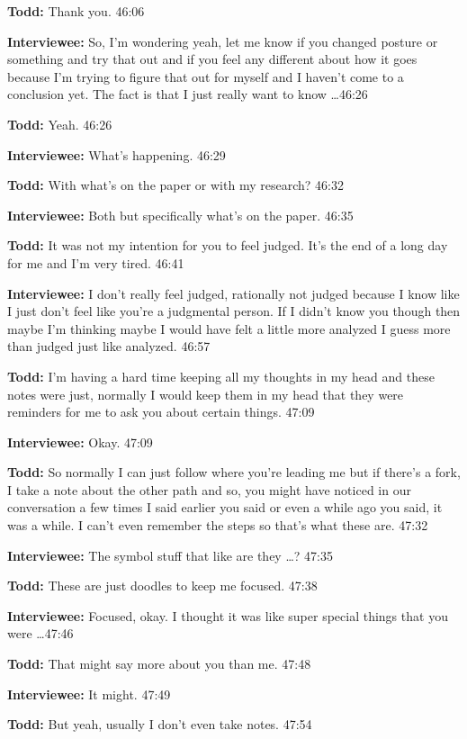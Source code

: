 \textbf{Todd:} Thank you.  46:06

\textbf{Interviewee:} So, I'm wondering yeah, let me know if you changed posture or something and try that out and if you feel any different about how it goes because I'm trying to figure that out for myself and I haven't come to a conclusion yet.  The fact is that I just really want to know \ldots  46:26

\textbf{Todd:} Yeah.  46:26

\textbf{Interviewee:} What's happening.  46:29

\textbf{Todd:} With what's on the paper or with my research?  46:32

\textbf{Interviewee:} Both but specifically what's on the paper.  46:35

\textbf{Todd:} It was not my intention for you to feel judged.  It's the end of a long day for me and I'm very tired.  46:41

\textbf{Interviewee:} I don't really feel judged, rationally not judged because I know like I just don't feel like you're a judgmental person.  If I didn't know you though then maybe I'm thinking maybe I would have felt a little more analyzed I guess more than judged just like analyzed.  46:57

\textbf{Todd:} I'm having a hard time keeping all my thoughts in my head and these notes were just, normally I would keep them in my head that they were reminders for me to ask you about certain things.  47:09

\textbf{Interviewee:} Okay.  47:09

\textbf{Todd:} So normally I can just follow where you're leading me but if there's a fork, I take a note about the other path and so, you might have noticed in our conversation a few times I said earlier you said or even a while ago you said, it was a while.  I can't even remember the steps so that's what these are.  47:32

\textbf{Interviewee:} The symbol stuff that like are they \ldots?  47:35

\textbf{Todd:} These are just doodles to keep me focused.  47:38

\textbf{Interviewee:} Focused, okay.  I thought it was like super special things that you were \ldots  47:46

\textbf{Todd:} That might say more about you than me.  47:48

\textbf{Interviewee:} It might.  47:49

\textbf{Todd:} But yeah, usually I don't even take notes.  47:54

